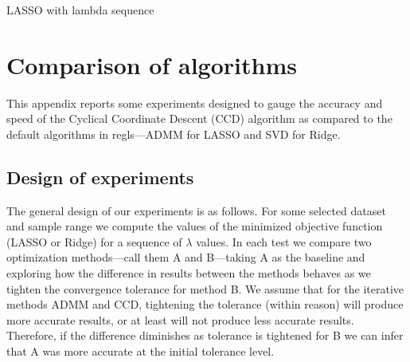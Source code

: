 \documentclass{article}
\newcommand{\startappendices}{%
\newcounter{appcount}
\setcounter{appcount}{0}
\renewcommand{\thesection}{Appendix \Alph{appcount}}}
\newcommand{\myappendix}[1]{%
\addtocounter{appcount}{1}
\section{#1}}
\begin{document}
\begin{script}
  \caption{LASSO with lambda sequence}
  \label{script:lamseq}
\end{script}




\clearpage
\startappendices

\myappendix{Comparison of algorithms}
\label{app:ccd}

This appendix reports some experiments designed to gauge the accuracy
and speed of the Cyclical Coordinate Descent (CCD) algorithm as
compared to the default algorithms in \textsf{regls}---ADMM for LASSO
and SVD for Ridge.

\subsection*{Design of experiments}

The general design of our experiments is as follows. For some selected
dataset and sample range we compute the values of the minimized
objective function (LASSO or Ridge) for a sequence of $\lambda$
values. In each test we compare two optimization methods---call them A
and B---taking A as the baseline and exploring how the difference in
results between the methods behaves as we tighten the convergence
tolerance for method B. We assume that for the iterative methods ADMM
and CCD, tightening the tolerance (within reason) will produce more
accurate results, or at least will not produce less accurate
results. Therefore, if the difference diminishes as tolerance is
tightened for B we can infer that A was more accurate at the initial
tolerance level.
\end{document}
